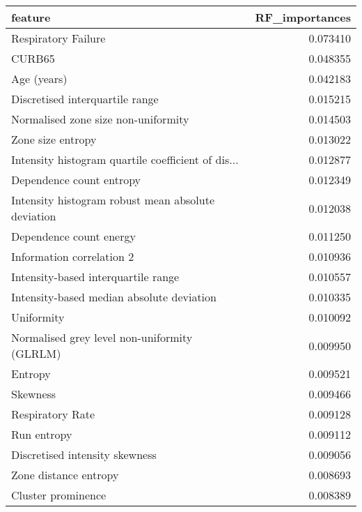 \begin{tabular}{lr}
\toprule
feature &  RF\_importances \\
\midrule
Respiratory Failure                                &        0.073410 \\
CURB65                                             &        0.048355 \\
Age (years)                                        &        0.042183 \\
Discretised interquartile range                    &        0.015215 \\
Normalised zone size non-uniformity                &        0.014503 \\
Zone size entropy                                  &        0.013022 \\
Intensity histogram quartile coefficient of dis... &        0.012877 \\
Dependence count entropy                           &        0.012349 \\
Intensity histogram robust mean absolute deviation &        0.012038 \\
Dependence count energy                            &        0.011250 \\
Information correlation 2                          &        0.010936 \\
Intensity-based interquartile range                &        0.010557 \\
Intensity-based median absolute deviation          &        0.010335 \\
Uniformity                                         &        0.010092 \\
Normalised grey level non-uniformity (GLRLM)       &        0.009950 \\
Entropy                                            &        0.009521 \\
Skewness                                           &        0.009466 \\
Respiratory Rate                                   &        0.009128 \\
Run entropy                                        &        0.009112 \\
Discretised intensity skewness                     &        0.009056 \\
Zone distance entropy                              &        0.008693 \\
Cluster prominence                                 &        0.008389 \\

\end{tabular}
